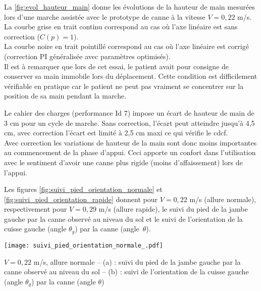 La \ref{fig:evol_hauteur_main} donne les évolutions de la hauteur de main mesurées lors d'une marche assistée avec le prototype de canne à la vitesse $V = 0,22$ m/s.\\ La courbe grise en trait continu correspond au cas où l'axe linéaire est sans correction ($C(p) = 1$).\\ La courbe noire en trait pointillé correspond au cas où l'axe linéaire est corrigé (correction PI généralisée avec paramètres optimisés). \\Il est à remarquer que lors de cet essai, le patient avait pour consigne de conserver sa main immobile lors du déplacement. Cette condition est difficilement vérifiable en pratique car le patient ne peut pas vraiment se concentrer sur la position de sa main pendant la marche.
\vspace{1em}
\fi


\ifprof
\begin{corrige}
Le cahier des charges (performance Id 7) impose un écart de hauteur de main de 3 cm pour un cycle de marche. Sans correction, l'écart peut atteindre jusqu'à 4,5 cm, avec correction l'écart est limité à 2,5 cm maxi ce qui vérifie le cdcf.\\
Avec correction les variations de hauteur de la main sont donc moins importantes au commencement de la phase d'appui. Ceci apporte un confort dans l'utilisation avec le sentiment d'avoir une canne plus rigide (moins d'affaissement) lors de l'appui.
\end{corrige}
\fi


\ifprof
\else
\vspace{1em}
Les figures \ref{fig:suivi_pied_orientation_normale} et \ref{fig:suivi_pied_orientation_rapide} donnent pour $V = 0,22$ m/s (allure normale), respectivement pour $V = 0,29$ m/s (allure rapide), le suivi du pied de la jambe gauche par la canne observé au niveau du sol et le suivi de l'orientation de la cuisse gauche (angle $\theta_g$) par la canne (angle~$\theta$).


\begin{marginfigure}%
\texttt{[image: suivi\_pied\_orientation\_normale\_.pdf]}
   \caption{{ $V = 0,22$ m/s, allure normale -- (a) : suivi du pied de la jambe gauche par la canne observé au niveau du sol -- (b) : suivi de l'orientation de la cuisse gauche (angle $\theta_g$) par la canne (angle $\theta$)} 
\label{fig:suivi_pied_orientation_normale}}
\end{marginfigure}


